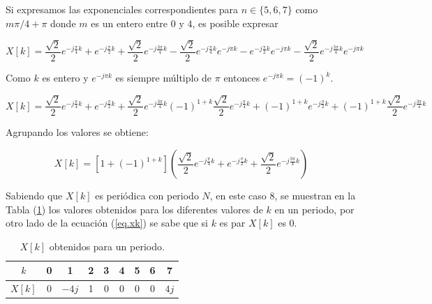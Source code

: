 \documentclass{article}
\begin{document}
Si expresamos las exponenciales correspondientes para $n \in \{ 5, 6 ,7 \}$ como $m\pi/4 + \pi$ donde $m$ es un entero entre 
$0$ y $4$, es posible expresar 

\begin{equation}
    X[k] = \frac{\sqrt{2}}{2} e^{-j\frac{\pi }{4}k} + e^{-j\frac{\pi }{2}k} + \frac{\sqrt{2}}{2} e^{-j\frac{3\pi }{4}k}
    - \frac{\sqrt{2}}{2} e^{-j\frac{\pi }{4}k} e^{-j\pi k} - e^{-j\frac{\pi }{2}k}e^{-j\pi k} - \frac{\sqrt{2}}{2} e^{-j\frac{3\pi }{4}k} e^{-j\pi k}
\end{equation}

Como $k$ es entero y $e^{-j\pi k}$ es siempre múltiplo de $\pi$ entonces $e^{-j\pi k} = (-1)^k$.

\begin{equation}
    X[k] = \frac{\sqrt{2}}{2} e^{-j\frac{\pi }{4}k} + e^{-j\frac{\pi }{2}k} + \frac{\sqrt{2}}{2} e^{-j\frac{3\pi }{4}k}
    (-1)^{1+k} \frac{\sqrt{2}}{2} e^{-j\frac{\pi }{4}k} +(-1)^{1+k} e^{-j\frac{\pi }{2}k} + (-1)^{1+k}\frac{\sqrt{2}}{2} e^{-j\frac{3\pi }{4}k} 
\end{equation}

Agrupando los valores se obtiene:

\begin{equation}
    X[k]= [ 1 + (-1)^{1+k} ] ( \frac{\sqrt{2}}{2} e^{-j\frac{\pi }{4}k} +e^{-j\frac{\pi }{2}k} + 
    \frac{\sqrt{2}}{2}  e^{-j\frac{3\pi }{4}k} )
    \label{eq.xk}
\end{equation}


Sabiendo que $X[k]$ es periódica con periodo $N$, en este caso $8$, se muestran en la Tabla (\ref{tab.xk}) los valores obtenidos para 
los diferentes valores de $k$ en un periodo, por otro lado de la ecuación (\ref{eq.xk}) se sabe que si $k$ es par $X[k]$ es $0$.

\begin{table}[]
    \centering
    \begin{tabular}{|c|c|c|c|c|c|c|c|c|}
    \hline
    $k$    & 0 & 1                             & 2 & 3                             & 4 & 5                              & 6 & 7                              \\ \hline
    $X[k]$ & 0 & $-4j$ & 1 & 0 & 0 & 0 & 0 & $4j$ \\ \hline
    \end{tabular}
    \caption{$X[k]$ obtenidos para un periodo.}
    \label{tab.xk}

\end{table}
\end{document}
